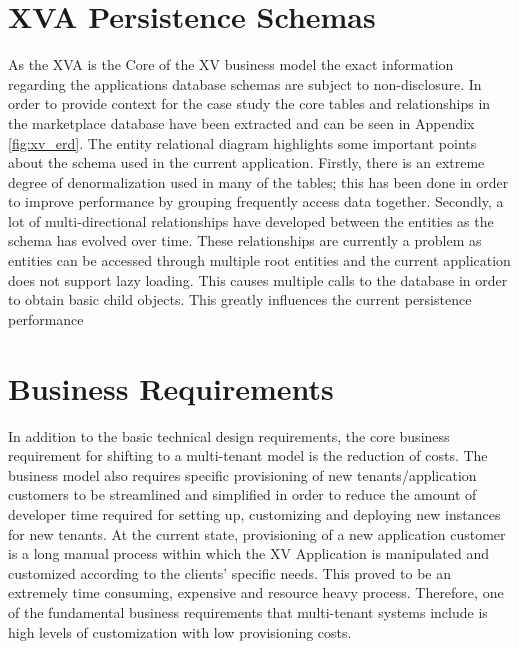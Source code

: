\section{XVA Persistence Schemas}
As the XVA is the Core of the XV business model the exact information regarding the applications database schemas are subject to non-disclosure. In order to provide context for the case study the core tables and relationships in the marketplace database have been extracted and can be seen in Appendix \ref{fig:xv_erd}. The entity relational diagram highlights some important points about the schema used in the current application. Firstly, there is an extreme degree of denormalization used in many of the tables; this has been done in order to improve performance by grouping frequently access data together. Secondly, a lot of multi-directional relationships have developed between the entities as the schema has evolved over time. These relationships are currently a problem as entities can be accessed through multiple root entities and the current application does not support lazy loading. This causes multiple calls to the database in order to obtain basic child objects. This greatly influences the current persistence performance



\section{Business Requirements}

In addition to the basic technical design requirements, the core business requirement for shifting to a multi-tenant model is the reduction of costs. The business model also requires specific provisioning of new tenants/application customers to be streamlined and simplified in order to reduce the amount of developer time required for setting up, customizing and deploying new instances for new tenants. At the current state, provisioning of a new application customer is a long manual process within which the XV Application is manipulated and customized according to the clients' specific needs. This proved to be an extremely time consuming, expensive and resource heavy process. Therefore, one of the fundamental business requirements that multi-tenant systems include is high levels of customization with low provisioning costs.

